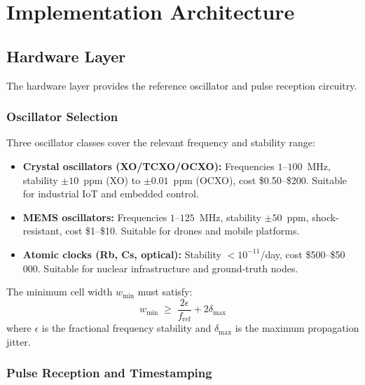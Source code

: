 \documentclass[twocolumn,10pt]{article}
\newcommand{\fref}{f_{\mathrm{ref}}}
\begin{document}
\section{Implementation Architecture}
\label{sec:impl}

\subsection{Hardware Layer}

The hardware layer provides the reference oscillator and pulse
reception circuitry.

\subsubsection{Oscillator Selection}

Three oscillator classes cover the relevant frequency and stability
range:

\begin{itemize}[leftmargin=1.5em,topsep=2pt,itemsep=1pt]
  \item \textbf{Crystal oscillators (XO/TCXO/OCXO):}
    Frequencies $1$--$100$~MHz, stability $\pm 10$~ppm (XO)
    to $\pm 0.01$~ppm (OCXO), cost \$0.50--\$200. Suitable for
    industrial IoT and embedded control.
  \item \textbf{MEMS oscillators:}
    Frequencies $1$--$125$~MHz, stability $\pm 50$~ppm,
    shock-resistant, cost \$1--\$10. Suitable for drones and
    mobile platforms.
  \item \textbf{Atomic clocks (Rb, Cs, optical):}
    Stability $<10^{-11}$/day, cost \$500--\$50\,000. Suitable for
    nuclear infrastructure and ground-truth nodes.
\end{itemize}

The minimum cell width $w_{\min}$ must satisfy:
\begin{equation}
  w_{\min} \;\geq\; \frac{2\epsilon}{\fref} + 2\delta_{\max}
  \label{eq:cellwidth}
\end{equation}
where $\epsilon$ is the fractional frequency stability and
$\delta_{\max}$ is the maximum propagation jitter.

\subsubsection{Pulse Reception and Timestamping}
\end{document}

